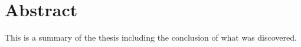 \chapter*{Abstract}

This is a summary of the thesis including the conclusion of what was discovered.

\hypersetup{pageanchor=false}